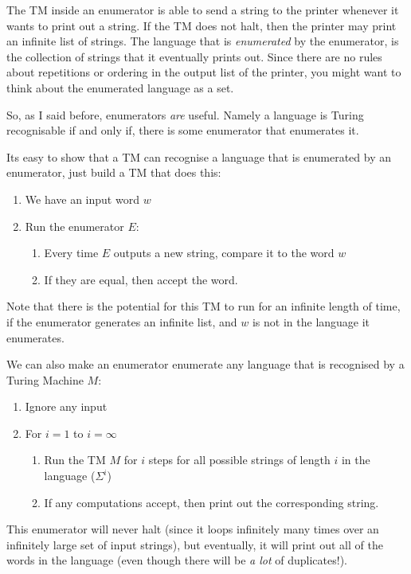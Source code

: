 The TM inside an enumerator is able to send a string to the printer whenever it
wants to print out a string. If the TM does not halt, then the printer may print
an infinite list of strings. The language that is \textit{enumerated} by the
enumerator, is the collection of strings that it eventually prints out. Since
there are no rules about repetitions or ordering in the output list of the
printer, you might want to think about the enumerated language as a set.

So, as I said before, enumerators \textit{are} useful. Namely a language is
Turing recognisable if and only if, there is some enumerator that enumerates it.

Its easy to show that a TM can recognise a language that is enumerated by an
enumerator, just build a TM that does this:

\begin{enumerate}
  \item We have an input word $w$
  \item Run the enumerator $E$:
  \begin{enumerate}
    \item Every time $E$ outputs a new string, compare it to the word $w$
    \item If they are equal, then accept the word.
  \end{enumerate}
\end{enumerate}

Note that there is the potential for this TM to run for an infinite length of
time, if the enumerator generates an infinite list, and $w$ is not in the
language it enumerates.

We can also make an enumerator enumerate any language that is recognised by a
Turing Machine $M$:

\begin{enumerate}
  \item Ignore any input
  \item For $i = 1$ to $i = \infty$
  \begin{enumerate}
    \item Run the TM $M$ for $i$ steps for all possible strings of length $i$ in
      the language ($\Sigma^i$)
    \item If any computations accept, then print out the corresponding string.
  \end{enumerate}
\end{enumerate}

This enumerator will never halt (since it loops infinitely many times over an
infinitely large set of input strings), but eventually, it will print out all of
the words in the language (even though there will be \textit{a lot} of
duplicates!).

